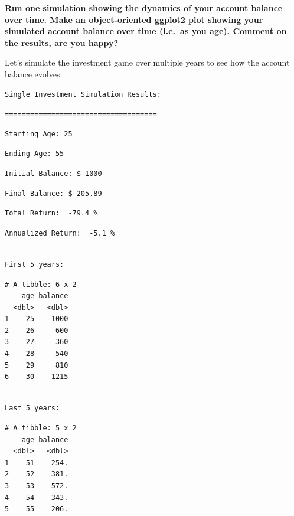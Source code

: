 \documentclass[
  letterpaper,
  DIV=11,
  numbers=noendperiod]{scrartcl}
\theoremstyle{definition}
\theoremstyle{remark}
\begin{document}
\textbf{Run one simulation showing the dynamics of your account balance
over time. Make an object-oriented ggplot2 plot showing your simulated
account balance over time (i.e.~as you age). Comment on the results, are
you happy?}

Let's simulate the investment game over multiple years to see how the
account balance evolves:

\begin{verbatim}
Single Investment Simulation Results:
\end{verbatim}

\begin{verbatim}
====================================
\end{verbatim}

\begin{verbatim}
Starting Age: 25
\end{verbatim}

\begin{verbatim}
Ending Age: 55
\end{verbatim}

\begin{verbatim}
Initial Balance: $ 1000 
\end{verbatim}

\begin{verbatim}
Final Balance: $ 205.89 
\end{verbatim}

\begin{verbatim}
Total Return:  -79.4 %
\end{verbatim}

\begin{verbatim}
Annualized Return:  -5.1 %
\end{verbatim}

\begin{verbatim}

First 5 years:
\end{verbatim}

\begin{verbatim}
# A tibble: 6 x 2
    age balance
  <dbl>   <dbl>
1    25    1000
2    26     600
3    27     360
4    28     540
5    29     810
6    30    1215
\end{verbatim}

\begin{verbatim}

Last 5 years:
\end{verbatim}

\begin{verbatim}
# A tibble: 5 x 2
    age balance
  <dbl>   <dbl>
1    51    254.
2    52    381.
3    53    572.
4    54    343.
5    55    206.
\end{verbatim}
\end{document}
